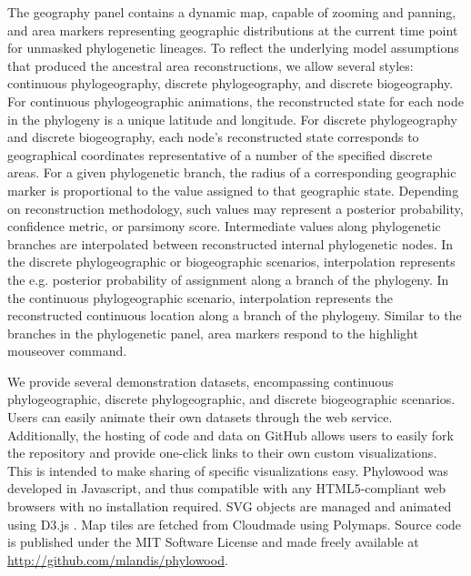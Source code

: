 \documentclass{bioinfo}
\begin{document}
The geography panel contains a dynamic map, capable of zooming and panning, and area markers representing geographic distributions at the current time point for unmasked phylogenetic lineages. To reflect the underlying model assumptions that produced the ancestral area reconstructions, we allow several styles: continuous phylogeography, discrete phylogeography, and discrete biogeography. For continuous phylogeographic animations, the reconstructed state for each node in the phylogeny is a unique latitude and longitude. For discrete phylogeography and discrete biogeography, each node's reconstructed state corresponds to geographical coordinates representative of a number of the specified discrete areas. For a given phylogenetic branch, the radius of a corresponding geographic marker is proportional to the value assigned to that geographic state. Depending on reconstruction methodology, such values may represent a posterior probability, confidence metric, or parsimony score. Intermediate values along phylogenetic branches are interpolated between reconstructed internal phylogenetic nodes. In the discrete phylogeographic or biogeographic scenarios, interpolation represents the e.g. posterior probability of assignment along a branch of the phylogeny. In the continuous phylogeographic scenario, interpolation represents the reconstructed continuous location along a branch of the phylogeny. Similar to the branches in the phylogenetic panel, area markers respond to the highlight mouseover command.

We provide several demonstration datasets, encompassing continuous phylogeographic, discrete phylogeographic, and discrete biogeographic scenarios. Users can easily animate their own datasets through the web service. Additionally, the hosting of code and data on GitHub allows users to easily fork the repository and provide one-click links to their own custom visualizations. This is intended to make sharing of specific visualizations easy.
Phylowood was developed in Javascript, and thus compatible with any HTML5-compliant web browsers with no installation required. SVG objects are managed and animated using D3.js \citep{bostock11}. Map tiles are fetched from Cloudmade using Polymaps. Source code is published under the MIT Software License and made freely available at \href{http://github.com/mlandis/phylowood}{http://github.com/mlandis/phylowood}.
\end{document}
